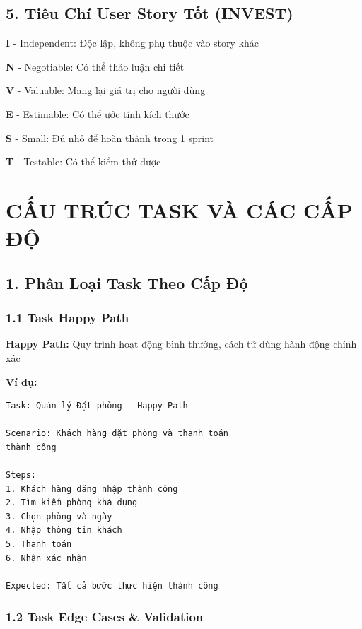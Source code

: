 \documentclass[12pt, a4paper]{report}
\begin{document}
\section{5. Tiêu Chí User Story Tốt (INVEST)}

\begin{tcolorbox}[colback=red!5, colframe=red!50]
\textbf{I} - Independent: Độc lập, không phụ thuộc vào story khác

\textbf{N} - Negotiable: Có thể thảo luận chi tiết

\textbf{V} - Valuable: Mang lại giá trị cho người dùng

\textbf{E} - Estimable: Có thể ước tính kích thước

\textbf{S} - Small: Đủ nhỏ để hoàn thành trong 1 sprint

\textbf{T} - Testable: Có thể kiểm thử được
\end{tcolorbox}

\newpage

\chapter{CẤU TRÚC TASK VÀ CÁC CẤP ĐỘ}

\section{1. Phân Loại Task Theo Cấp Độ}

\subsection{1.1 Task Happy Path}

\begin{tcolorbox}[colback=green!5]
\textbf{Happy Path:} Quy trình hoạt động bình thường, cách tử dùng hành động chính xác

\textbf{Ví dụ:} 
\begin{lstlisting}
Task: Quản lý Đặt phòng - Happy Path

Scenario: Khách hàng đặt phòng và thanh toán 
thành công

Steps:
1. Khách hàng đăng nhập thành công
2. Tìm kiếm phòng khả dụng
3. Chọn phòng và ngày
4. Nhập thông tin khách
5. Thanh toán
6. Nhận xác nhận

Expected: Tất cả bước thực hiện thành công
\end{lstlisting}
\end{tcolorbox}

\subsection{1.2 Task Edge Cases & Validation}
\end{document}
